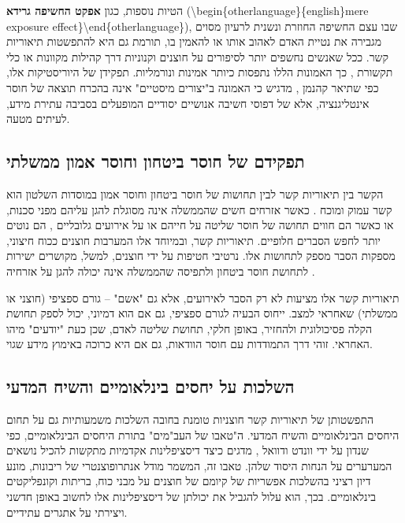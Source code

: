 \documentclass[12pt,a4paper]{article}
\begin{document}
הטיות נוספות, כגון \textbf{אפקט החשיפה גרידא} (\textbackslash{}begin\{otherlanguage\}\{english\}mere exposure effect\}\textbackslash{}end\{otherlanguage\}), שבו עצם החשיפה החוזרת ונשנית לרעיון מסוים מגבירה את נטיית האדם לאהוב אותו או להאמין בו, תורמת גם היא להתפשטות תיאוריות קשר. ככל שאנשים נחשפים יותר לסיפורים על חוצנים וקנוניות דרך קהילות מקוונות או כלי תקשורת \cite{AntonVugrin2022, Costa2024}, כך האמונות הללו נתפסות כיותר אמינות ונורמליות. תפקידן של היוריסטיקות אלו, כפי שתיאר קהנמן \cite{Wojcik2021Kahneman2011}, מדגיש כי האמונה ב"יצורים מיסטיים" אינה בהכרח תוצאה של חוסר אינטליגנציה, אלא של דפוסי חשיבה אנושיים יסודיים המופעלים בסביבה עתירת מידע, לעיתים מטעה.

\subsection{תפקידם של חוסר ביטחון וחוסר אמון ממשלתי}
הקשר בין תיאוריות קשר לבין תחושות של חוסר ביטחון וחוסר אמון במוסדות השלטון הוא קשר עמוק ומוכח \cite{UnknownAbduction}. כאשר אזרחים חשים שהממשלה אינה מסוגלת להגן עליהם מפני סכנות, או כאשר הם חווים תחושה של חוסר שליטה על חייהם או על אירועים גלובליים \cite{Douglas2015}, הם נוטים יותר לחפש הסברים חלופיים. תיאוריות קשר, ובמיוחד אלו המערבות חוצנים ככוח חיצוני, מספקות הסבר מספק לתחושות אלו. נרטיבי חטיפות על ידי חוצנים, למשל, מקושרים ישירות לתחושת חוסר ביטחון ולתפיסה שהממשלה אינה יכולה להגן על אזרחיה \cite{UnknownAbduction}.

תיאוריות קשר אלו מציעות לא רק הסבר לאירועים, אלא גם "אשם" – גורם ספציפי (חוצני או ממשלתי) שאחראי למצב. ייחוס הבעיה לגורם ספציפי, גם אם הוא דמיוני, יכול לספק תחושת הקלה פסיכולוגית ולהחזיר, באופן חלקי, תחושת שליטה לאדם, שכן כעת "יודעים" מיהו האחראי. זוהי דרך התמודדות עם חוסר הוודאות, גם אם היא כרוכה באימוץ מידע שגוי.

\subsection{השלכות על יחסים בינלאומיים והשיח המדעי}
התפשטותן של תיאוריות קשר חוצניות טומנת בחובה השלכות משמעותיות גם על תחום היחסים הבינלאומיים והשיח המדעי. ה"טאבו של העב"מים" בתורת היחסים הבינלאומיים, כפי שנדון על ידי וונדט ודוואל \cite{Wendt2008}, מדגים כיצד דיסציפלינות אקדמיות מתקשות להכיל נושאים המערערים על הנחות היסוד שלהן. טאבו זה, המשמר מודל אנתרופוצנטרי של ריבונות, מונע דיון רציני בהשלכות אפשריות של קיומם של חוצנים על מבני כוח, בריתות וקונפליקטים בינלאומיים. בכך, הוא עלול להגביל את יכולתן של דיסציפלינות אלו לחשוב באופן חדשני ויצירתי על אתגרים עתידיים.
\end{document}
